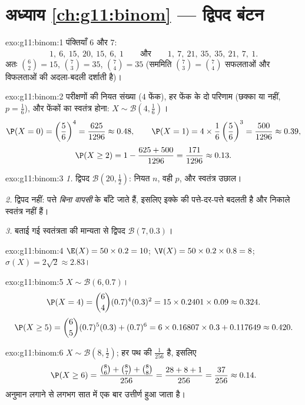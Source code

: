 \section*{अध्याय \ref{ch:g11:binom} --- द्विपद बंटन}

\begin{solution}{exo:g11:binom:1}
पंक्तियाँ $6$ और $7$:
\[
1,\ 6,\ 15,\ 20,\ 15,\ 6,\ 1
\qquad\text{और}\qquad
1,\ 7,\ 21,\ 35,\ 35,\ 21,\ 7,\ 1 .
\]
अतः $\binom62 = 15$, $\binom73 = 35$, $\binom74 = 35$ (सममिति $\binom73 = \binom74$ सफलताओं और विफलताओं की अदला-बदली दर्शाती है)।
\end{solution}

\begin{solution}{exo:g11:binom:2}
परीक्षणों की नियत संख्या ($4$ फेंक), हर फेंक के दो परिणाम (छक्का या नहीं,
$p = \frac16$), और फेंकों का स्वतंत्र होना: $X \sim \mathcal B(4, \frac16)$।
\[
\P(X=0) = \left(\frac56\right)^4 = \frac{625}{1296} \approx 0.48,
\qquad
\P(X=1) = 4 \times \frac16\left(\frac56\right)^3 = \frac{500}{1296}
\approx 0.39,
\]
\[
\P(X \geq 2) = 1 - \frac{625 + 500}{1296} = \frac{171}{1296}
\approx 0.13 .
\]
\end{solution}

\begin{solution}{exo:g11:binom:3}
\emph{1.} द्विपद $\mathcal B(20, \frac12)$: नियत $n$, वही $p$, और स्वतंत्र उछाल।

\emph{2.} द्विपद नहीं: पत्ते \emph{बिना वापसी} के बाँटे जाते हैं, इसलिए
इक्के की  पत्ते-दर-पत्ते बदलती है और निकाले स्वतंत्र नहीं हैं।

\emph{3.} बताई गई स्वतंत्रता की मान्यता से द्विपद $\mathcal B(7, 0.3)$।
\end{solution}

\begin{solution}{exo:g11:binom:4}
$\E(X) = 50 \times 0.2 = 10$; $\V(X) = 50 \times 0.2 \times 0.8 = 8$; $\sigma(X) = 2\sqrt2 \approx 2.83$।
\end{solution}

\begin{solution}{exo:g11:binom:5}
$X \sim \mathcal B(6, 0.7)$।
\[
\P(X = 4) = \binom64 (0.7)^4 (0.3)^2 = 15 \times 0.2401 \times 0.09
\approx 0.324 .
\]
\[
\P(X \geq 5) = \binom65 (0.7)^5(0.3) + (0.7)^6
= 6 \times 0.16807 \times 0.3 + 0.117649 \approx 0.420 .
\]
\end{solution}

\begin{solution}{exo:g11:binom:6}
$X \sim \mathcal B\left(8, \frac12\right)$; हर पथ की  $\frac{1}{256}$ है, इसलिए
\[
\P(X \geq 6) = \frac{\binom86 + \binom87 + \binom88}{256}
= \frac{28 + 8 + 1}{256} = \frac{37}{256} \approx 0.14 .
\]
अनुमान लगाने से लगभग सात में एक बार उत्तीर्ण हुआ जाता है।
\end{solution}

